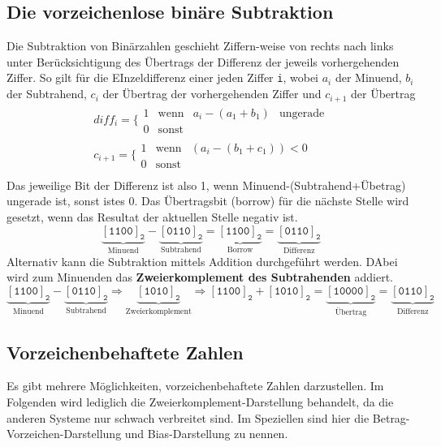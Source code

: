 \subsection{Die vorzeichenlose binäre Subtraktion}
Die Subtraktion von Binärzahlen geschieht Ziffern-weise von rechts nach links unter Berücksichtigung des Übertrags der Differenz der jeweils vorhergehenden Ziffer. So gilt für die EInzeldifferenz einer jeden Ziffer \texttt{i}, wobei $a_i$ der Minuend, $b_i$ der Subtrahend, $c_i$ der Übertrag der vorhergehenden Ziffer und $c_{i+1}$ der Übertrag
\begin{equation}
\boxed{
\begin{array}{lll}
diff_i=\Bigg\{\begin{matrix}1&\text{wenn}&a_i-(a_1+b_1)&\text{ungerade}\\0&\text{sonst}\end{matrix}\\
c_{i+1}=\Bigg\{\begin{matrix}1&\text{wenn}&(a_i-(b_1+c_1))<0&\\0&\text{sonst}\end{matrix}\\
\end{array}
}
\end{equation}
Das jeweilige Bit der Differenz ist also 1, wenn Minuend-(Subtrahend+Übetrag) ungerade ist, sonst istes 0. Das Übertragsbit (borrow) für die nächste Stelle wird gesetzt, wenn das Resultat der aktuellen Stelle negativ ist.
\begin{equation}
\underbrace{[\texttt{1100}]_{\texttt{2}}}_{\text{Minuend}}-\underbrace{[\texttt{0110}]_{\texttt{2}}}_{\text{Subtrahend}}=\underbrace{[\texttt{1100}]_{\texttt{2}}}_{\text{Borrow}}=\underbrace{[\texttt{0110}]_{\texttt{2}}}_{\text{Differenz}}
\end{equation}
Alternativ kann die Subtraktion mittels Addition durchgeführt werden. DAbei wird zum Minuenden das {\color{red}\textbf{Zweierkomplement des Subtrahenden}} addiert. 
\begin{equation}
\underbrace{[\texttt{1100}]_{\texttt{2}}}_{\text{Minuend}}-\underbrace{[\texttt{0110}]_{\texttt{2}}}_{\text{Subtrahend}}\Longrightarrow \underbrace{[\texttt{1010}]_{\texttt{2}}}_{\text{Zweierkomplement}}\Longrightarrow [\texttt{1100}]_{\texttt{2}}+[\texttt{1010}]_{\texttt{2}}=\underbrace{[\texttt{10000}]_{\texttt{2}}}_{\text{Übertrag}}=\underbrace{[\texttt{0110}]_{\texttt{2}}}_{\text{Differenz}}
\end{equation}
\subsection{Vorzeichenbehaftete Zahlen}
Es gibt mehrere Möglichkeiten, vorzeichenbehaftete Zahlen darzustellen. Im Folgenden wird lediglich die Zweierkomplement-Darstellung behandelt, da die anderen Systeme nur schwach verbreitet sind. Im Speziellen sind hier die Betrag-Vorzeichen-Darstellung und Bias-Darstellung zu nennen. 